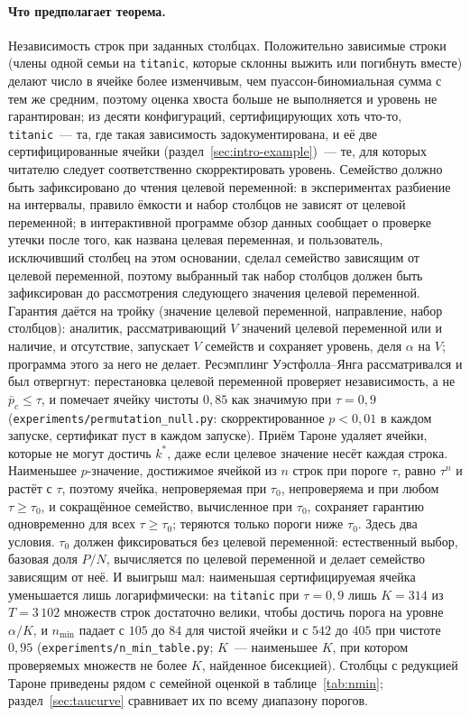 \documentclass[11pt]{article}
\begin{document}
\paragraph{Что предполагает теорема.} Независимость строк при заданных столбцах. Положительно зависимые строки (члены одной семьи на \texttt{titanic}, которые склонны выжить или погибнуть вместе) делают число в ячейке более изменчивым, чем пуассон-биномиальная сумма с тем же средним, поэтому оценка хвоста больше не выполняется и уровень не гарантирован; из десяти конфигураций, сертифицирующих хоть что-то, \texttt{titanic}~--- та, где такая зависимость задокументирована, и её две сертифицированные ячейки (раздел~\ref{sec:intro-example})~--- те, для которых читателю следует соответственно скорректировать уровень. Семейство должно быть зафиксировано до чтения целевой переменной: в экспериментах разбиение на интервалы, правило ёмкости и набор столбцов не зависят от целевой переменной; в интерактивной программе обзор данных сообщает о проверке утечки после того, как названа целевая переменная, и пользователь, исключивший столбец на этом основании, сделал семейство зависящим от целевой переменной, поэтому выбранный так набор столбцов должен быть зафиксирован до рассмотрения следующего значения целевой переменной. Гарантия даётся на тройку (значение целевой переменной, направление, набор столбцов): аналитик, рассматривающий $V$ значений целевой переменной или и наличие, и отсутствие, запускает $V$ семейств и сохраняет уровень, деля $\alpha$ на $V$; программа этого за него не делает. Ресэмплинг Уэстфолла--Янга рассматривался и был отвергнут: перестановка целевой переменной проверяет независимость, а не $\bar p_c\le\tau$, и помечает ячейку чистоты $0{,}85$ как значимую при $\tau=0{,}9$ (\texttt{experiments/permutation\_null.py}: скорректированное $p<0{,}01$ в каждом запуске, сертификат пуст в каждом запуске). Приём Тароне удаляет ячейки, которые не могут достичь $k^*$, даже если целевое значение несёт каждая строка. Наименьшее $p$-значение, достижимое ячейкой из $n$ строк при пороге $\tau$, равно $\tau^n$ и растёт с $\tau$, поэтому ячейка, непроверяемая при $\tau_0$, непроверяема и при любом $\tau\ge\tau_0$, и сокращённое семейство, вычисленное при $\tau_0$, сохраняет гарантию одновременно для всех $\tau\ge\tau_0$; теряются только пороги ниже $\tau_0$. Здесь два условия. $\tau_0$ должен фиксироваться без целевой переменной: естественный выбор, базовая доля $P/N$, вычисляется по целевой переменной и делает семейство зависящим от неё. И выигрыш мал: наименьшая сертифицируемая ячейка уменьшается лишь логарифмически: на \texttt{titanic} при $\tau=0{,}9$ лишь $K=314$ из $T=3\,102$ множеств строк достаточно велики, чтобы достичь порога на уровне $\alpha/K$, и $n_{\min}$ падает с $105$ до $84$ для чистой ячейки и с $542$ до $405$ при чистоте $0{,}95$ (\texttt{experiments/n\_min\_table.py}; $K$~--- наименьшее $K$, при котором проверяемых множеств не более $K$, найденное бисекцией). Столбцы с редукцией Тароне приведены рядом с семейной оценкой в таблице~\ref{tab:nmin}; раздел~\ref{sec:taucurve} сравнивает их по всему диапазону порогов.
\end{document}
